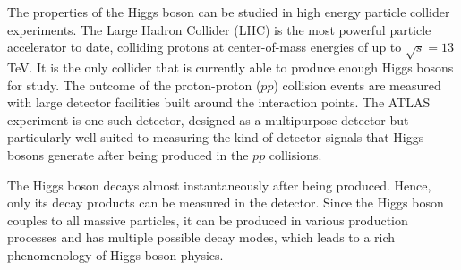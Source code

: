 
The properties of the Higgs boson can be studied in high energy particle collider experiments. 
The Large Hadron Collider (LHC) is the most powerful particle accelerator to date, colliding protons at center-of-mass energies of up to $\sqrt{s} = 13\,$TeV. It is the only collider that is currently able to produce enough Higgs bosons for study.
The outcome of the proton-proton ($pp$) collision events are measured with large detector facilities built around the interaction points. 
The ATLAS experiment is one such detector, designed as a multipurpose detector but particularly well-suited to measuring the kind of detector signals that Higgs bosons generate after being produced in the $pp$ collisions.

The Higgs boson decays almost instantaneously after being produced. Hence, only its decay products can be measured in the detector. Since the Higgs boson couples to all massive particles, it can be produced in various production processes and has multiple possible decay modes, which leads to a rich phenomenology of Higgs boson physics. 

